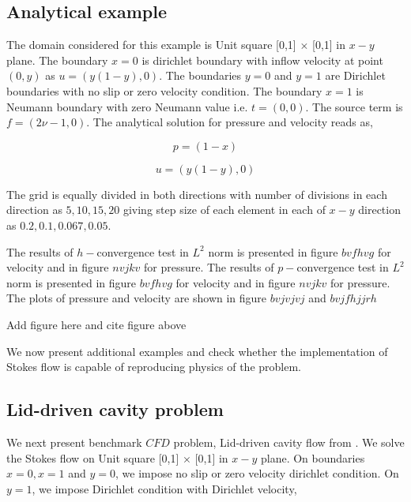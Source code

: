 \documentclass[a4paper,12pt]{book}
\begin{document}
\subsection{Analytical example}

The domain considered for this example is Unit square [0,1] $\times$ [0,1] in $x-y$ plane. 
The boundary ${x=0}$ is dirichlet boundary with inflow velocity at point $(0,y)$ as $u = (y(1-y), 0)$. The boundaries ${y = 0}$ and ${y = 1}$ are Dirichlet boundaries with no slip or zero velocity condition. The boundary ${x = 1}$ is Neumann boundary with zero Neumann value i.e. $t = (0, 0)$. The source term is $f = (2 \nu - 1, 0)$. The analytical solution for pressure and velocity reads as,

\begin{center}

\begin{equation}
p = (1 - x)
\end{equation}

\begin{equation} 
 u = (y(1-y), 0)
\end{equation}

\end{center}

The grid is equally divided in both directions with number of divisions in each direction as $5,10,15,20$ giving step size of each element in each of $x-y$ direction as $0.2,0.1,0.067,0.05$.

The results of $h-$convergence test in $L^2$ norm is presented in figure $bvfhvg$ for velocity and in figure $nvjkv$ for pressure. The results of $p-$convergence test in $L^2$ norm is presented in figure $bvfhvg$ for velocity and in figure $nvjkv$ for pressure. The plots of pressure and velocity are shown in figure $bvjvjvj$ and $bvjfhjjrh$

\begin{Huge}
Add figure here and cite figure above
\end{Huge}

We now present additional examples and check whether the implementation of Stokes flow is capable of reproducing physics of the problem.

\subsection{Lid-driven cavity problem}

We next present benchmark $CFD$ problem, Lid-driven cavity flow from \cite{Montlaur}. We solve the Stokes flow on Unit square [0,1] $\times$ [0,1] in $x-y$ plane. On boundaries ${x = 0}, {x = 1}$ and ${y = 0}$, we impose no slip or zero velocity dirichlet condition. On ${y = 1}$, we impose Dirichlet condition with Dirichlet velocity,
\end{document}
